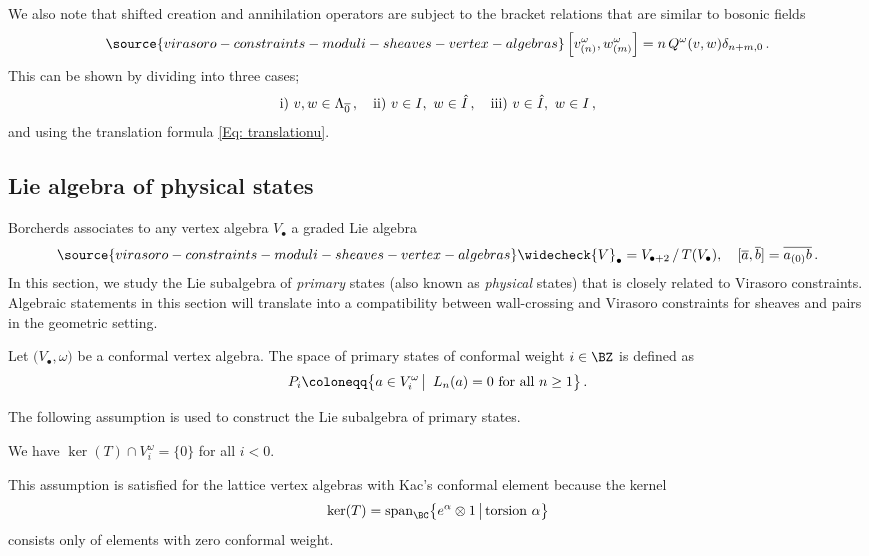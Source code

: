 We also note that shifted creation and annihilation operators are subject to the bracket relations that are similar to bosonic fields
\begin{equation}\label{eq: shifted bracket}
\source{virasoro-constraints-moduli-sheaves-vertex-algebras}
\left[v^{\omega}_{(n)},w^{\omega}_{(m)}\right]= n\, Q^{\omega}(v,w)\delta_{n+m,0}\,.
\end{equation}
This can be shown by dividing into three cases;
$$\textnormal{i) } v, w\in \Lambda_{\overline{0}}\,,\quad
\textnormal{ii) } v\in I,\ w\in \hat{I}\,,\quad
\textnormal{iii) } v\in \hat{I},\ w\in I\,,
$$
and using the translation formula \eqref{Eq: translationu}.

\subsection{Lie algebra of physical states}
\label{Sec: physical}

Borcherds \cite{Borcherds} associates to any vertex algebra $V_\bullet$ a graded Lie algebra
\begin{equation}\label{lie algebra}
\source{virasoro-constraints-moduli-sheaves-vertex-algebras}
\widecheck{V}_\bullet = V_{\bullet+2}\,/\,T(V_\bullet),\quad [\overline{a},\overline{b}]=\overline{a_{(0)}b}\,.
\end{equation}
In this section, we study the Lie subalgebra of {\it primary} states (also known as {\it physical} states) that is closely related to Virasoro constraints. Algebraic statements in this section will translate into a compatibility between wall-crossing and Virasoro constraints for sheaves and pairs in the geometric setting.

\begin{definition}
\notready
\label{Def: physicalstates}
Let $\big(V_\bullet,\omega\big)$ be a conformal vertex algebra. The space of primary states of conformal weight $i\in \BZ$ is defined as
$$P_i\coloneqq \big\{a\in V^\omega_i\,\big|\, \ L_n(a)=0\ \textnormal{for all}\ n\geq 1\big\}\,.
$$
\end{definition}

The following assumption is used to construct the Lie subalgebra of primary states.
\begin{assumption}
\notready\label{standard assumption}
We have $\ker(T)\cap V^\omega_i=\{0\}$ for all $i<0$.
\end{assumption}
This assumption is satisfied for the lattice vertex algebras with Kac's conformal element because the kernel
$$\ker(T)=\textnormal{span}_{\BC}\big\{e^{\alpha}\otimes 1\,\big|\,\textnormal{torsion } \alpha\big\}
$$
consists only of elements with zero conformal weight.

